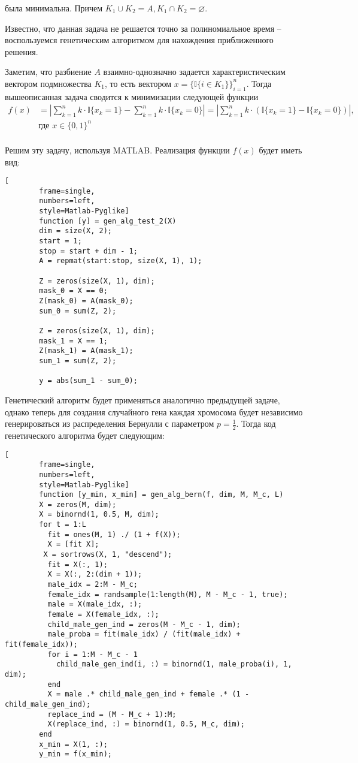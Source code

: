\documentclass[../main.tex]{subfiles}
\begin{document}
	была минимальна. Причем $K_1 \cup K_2 = A, K_1 \cap K_2 = \varnothing$.
	
	Известно, что данная задача не решается точно за полиномиальное время -- воспользуемся генетическим алгоритмом для нахождения приближенного решения.
	
	Заметим, что разбиение $A$ взаимно-однозначно задается характеристическим вектором подмножества $K_1$, то есть вектором $x = \{\mathbb{I}\{i \in K_1\}\}_{i=1}^n$. Тогда вышеописанная задача сводится к минимизации  следующей функции 
	\[\begin{aligned}
		f(x) &= \left|\sum_{k=1}^{n}k \cdot \mathbb{I}\{x_k = 1\}  - \sum_{k=1}^{n}k \cdot \mathbb{I}\{x_k = 0\} \right| = \left|\sum_{k=1}^{n}k \cdot (\mathbb{I}\{x_k = 1\}  -\mathbb{I}\{x_k = 0\})\right|, \\
		&\text{где }x \in \{0, 1\}^n \\
	\end{aligned}\]
	
	Решим эту задачу, используя MATLAB. Реализация функции $f(x)$ будет иметь вид:
	
	\begin{lstlisting}[
		frame=single,
		numbers=left,
		style=Matlab-Pyglike]
		function [y] = gen_alg_test_2(X)
		dim = size(X, 2);
		start = 1;
		stop = start + dim - 1;
		A = repmat(start:stop, size(X, 1), 1);
		
		Z = zeros(size(X, 1), dim);
		mask_0 = X == 0;
		Z(mask_0) = A(mask_0);
		sum_0 = sum(Z, 2);
		
		Z = zeros(size(X, 1), dim);
		mask_1 = X == 1;
		Z(mask_1) = A(mask_1);
		sum_1 = sum(Z, 2);
		
		y = abs(sum_1 - sum_0);	
	\end{lstlisting}

	Генетический алгоритм будет применяться аналогично предыдущей задаче, однако теперь для создания случайного гена каждая хромосома будет независимо генерироваться из распределения Бернулли с параметром $p = \frac{1}{2}$. Тогда код генетического алгоритма будет следующим:
	
		\begin{lstlisting}[
		frame=single,
		numbers=left,
		style=Matlab-Pyglike]
		function [y_min, x_min] = gen_alg_bern(f, dim, M, M_c, L) 
		X = zeros(M, dim);
		X = binornd(1, 0.5, M, dim);
		for t = 1:L
		  fit = ones(M, 1) ./ (1 + f(X));
		  X = [fit X];
	 	 X = sortrows(X, 1, "descend");
		  fit = X(:, 1);
		  X = X(:, 2:(dim + 1));
		  male_idx = 2:M - M_c;
		  female_idx = randsample(1:length(M), M - M_c - 1, true);
		  male = X(male_idx, :);
		  female = X(female_idx, :);
		  child_male_gen_ind = zeros(M - M_c - 1, dim);
		  male_proba = fit(male_idx) / (fit(male_idx) + fit(female_idx));
		  for i = 1:M - M_c - 1
		    child_male_gen_ind(i, :) = binornd(1, male_proba(i), 1, dim);
		  end
		  X = male .* child_male_gen_ind + female .* (1 - child_male_gen_ind);
		  replace_ind = (M - M_c + 1):M;
		  X(replace_ind, :) = binornd(1, 0.5, M_c, dim);
		end
		x_min = X(1, :);
		y_min = f(x_min);
	\end{lstlisting}
\end{document}
